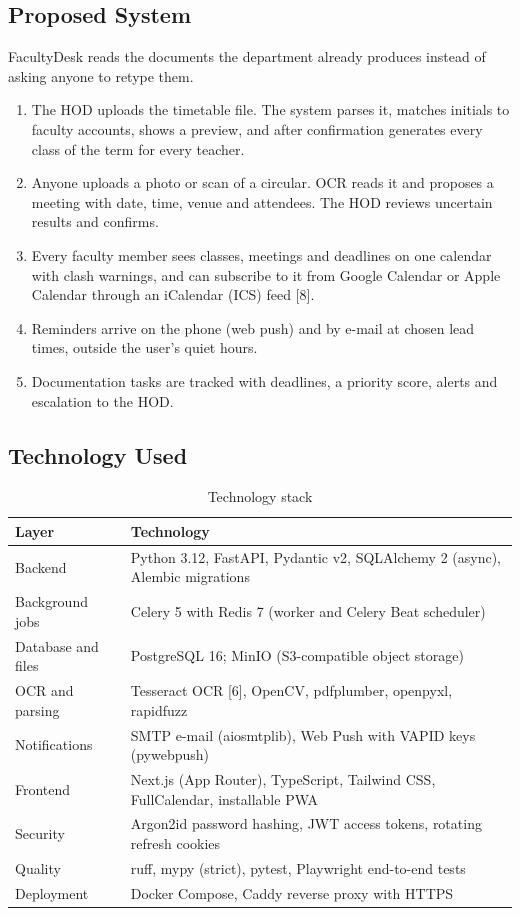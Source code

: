 \subsection{Proposed System}
FacultyDesk reads the documents the department already produces instead of asking anyone to retype them.
\begin{enumerate}
  \item The HOD uploads the timetable file. The system parses it, matches initials to faculty accounts, shows a preview, and after confirmation generates every class of the term for every teacher.
  \item Anyone uploads a photo or scan of a circular. OCR reads it and proposes a meeting with date, time, venue and attendees. The HOD reviews uncertain results and confirms.
  \item Every faculty member sees classes, meetings and deadlines on one calendar with clash warnings, and can subscribe to it from Google Calendar or Apple Calendar through an iCalendar (ICS) feed [8].
  \item Reminders arrive on the phone (web push) and by e-mail at chosen lead times, outside the user's quiet hours.
  \item Documentation tasks are tracked with deadlines, a priority score, alerts and escalation to the HOD.
\end{enumerate}

\subsection{Technology Used}
\begin{xltabular}{\textwidth}{|p{4.2cm}|Y|}
\caption{Technology stack}\\
\hline
\textbf{Layer} & \textbf{Technology} \\ \hline
Backend & Python 3.12, FastAPI, Pydantic v2, SQLAlchemy 2 (async), Alembic migrations \\ \hline
Background jobs & Celery 5 with Redis 7 (worker and Celery Beat scheduler) \\ \hline
Database and files & PostgreSQL 16; MinIO (S3-compatible object storage) \\ \hline
OCR and parsing & Tesseract OCR [6], OpenCV, pdfplumber, openpyxl, rapidfuzz \\ \hline
Notifications & SMTP e-mail (aiosmtplib), Web Push with VAPID keys (pywebpush) \\ \hline
Frontend & Next.js (App Router), TypeScript, Tailwind CSS, FullCalendar, installable PWA \\ \hline
Security & Argon2id password hashing, JWT access tokens, rotating refresh cookies \\ \hline
Quality & ruff, mypy (strict), pytest, Playwright end-to-end tests \\ \hline
Deployment & Docker Compose, Caddy reverse proxy with HTTPS \\ \hline
\end{xltabular}

